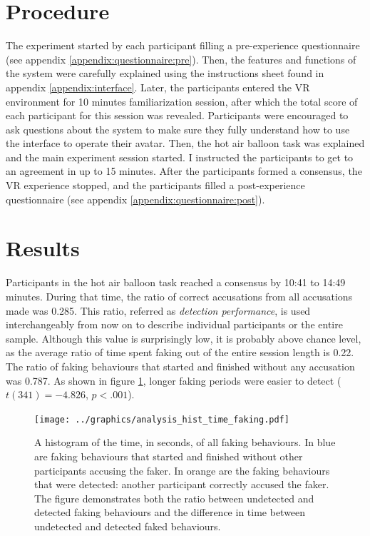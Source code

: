 \documentclass[]{simple-thesis}
\begin{document}
\section{Procedure}

The experiment started by each participant filling a pre-experience questionnaire (see appendix \ref{appendix:questionnaire:pre}).
Then, the features and functions of the system were carefully explained using the instructions sheet found in appendix \ref{appendix:interface}.
Later, the participants entered the VR environment for 10 minutes familiarization session, after which the total score of each participant for this session was revealed.
Participants were encouraged to ask questions about the system to make sure they fully understand how to use the interface to operate their avatar.
Then, the hot air balloon task was explained and the main experiment session started.
I instructed the participants to get to an agreement in up to 15 minutes.
After the participants formed a consensus, the VR experience stopped, and the participants filled a post-experience questionnaire (see appendix \ref{appendix:questionnaire:post}).

\section{Results}

Participants in the hot air balloon task reached a consensus by 10:41 to 14:49 minutes.
During that time, the ratio of correct accusations from all accusations made was 0.285.
This ratio, referred as \textit{detection performance}, is used interchangeably from now on to describe individual participants or the entire sample.
Although this value is surprisingly low, it is probably above chance level, as the average ratio of time spent faking out of the entire session length is 0.22.
The ratio of faking behaviours that started and finished without any accusation was 0.787.
As shown in figure \ref{fig:analysis:hist_time_faking}, longer faking periods were easier to detect ($t(341) = -4.826$, $p < .001$).

\begin{figure}
  \centering
  \texttt{[image: ../graphics/analysis\_hist\_time\_faking.pdf]}
  \caption{A histogram of the time, in seconds, of all faking behaviours. In blue are faking behaviours that started and finished without other participants accusing the faker. In orange are the faking behaviours that were detected: another participant correctly accused the faker. The figure demonstrates both the ratio between undetected and detected faking behaviours and the difference in time between undetected and detected faked behaviours.}
  \label{fig:analysis:hist_time_faking}
\end{figure}
\end{document}
